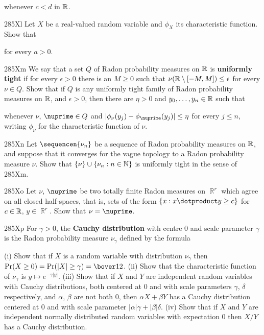 {\noindent whenever $c<d$ in $\Bbb R$.

\spheader 285Xl Let $X$ be a real-valued random variable and
$\phi_X$ its characteristic function.   Show that


\noindent for every $a>0$.

\spheader 285Xm We say that a set $Q$ of Radon probability
measures on $\Bbb R$ is {\bf uniformly tight} if for every $\epsilon>0$
there is
an $M\ge 0$ such that $\nu(\Bbb R\setminus[-M,M])\le\epsilon$ for every
$\nu\in Q$.    Show that if $Q$ is any uniformly tight family of Radon
probability
measures on $\Bbb R$, and $\epsilon>0$, then there are $\eta>0$ and
$y_0,\ldots,y_n\in\Bbb R$ such that


\noindent whenever $\nu$, $\nuprime\in Q$ and
$|\phi_{\nu}(y_j)-\phi_{\nuprime}(y_j)|\le\eta$ for every $j\le n$, writing
$\phi_{\nu}$ for the characteristic function of $\nu$.

\spheader 285Xn Let $\sequencen{\nu_n}$ be a sequence of Radon
probability measures on $\Bbb R$, and suppose that it converges for the
vague topology to a Radon probability measure $\nu$.   Show that
$\{\nu\}\cup\{\nu_n:n\in\Bbb N\}$ is uniformly tight in the sense of
285Xm.

\sqheader 285Xo Let $\nu$, $\nuprime$ be two totally finite Radon measures
on $\BbbR^r$ which agree on all closed half-spaces, that is, sets of
the form $\{x:x\dotproduct y\ge c\}$ for $c\in\Bbb R$, $y\in\BbbR^r$.
Show that $\nu=\nuprime$.   

\sqheader 285Xp
For $\gamma>0$, the {\bf Cauchy distribution} with
centre $0$ and scale parameter $\gamma$ is the Radon probability measure
$\nu_{\gamma}$ defined by the formula


\noindent (i) Show that if $X$ is a random variable with distribution
$\nu_{\gamma}$ then $\Pr(X\ge 0)=\Pr(|X|\ge\gamma)=\bover12$.
(ii) Show that the characteristic function of
$\nu_{\gamma}$ is $y\mapsto e^{-\gamma|y|}$.      (iii)
Show that if $X$ and $Y$ are independent random variables with Cauchy
distributions, both centered at $0$ and with scale parameters $\gamma$,
$\delta$ respectively, and $\alpha$, $\beta$ are not both $0$, then
$\alpha X+\beta Y$ has a Cauchy distribution centered at $0$ and with
scale parameter $|\alpha|\gamma+|\beta|\delta$.   (iv) Show that if $X$
and $Y$ are independent normally distributed random variables with expectation $0$ then $X/Y$ has a Cauchy distribution.

}
